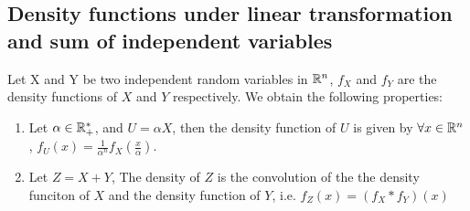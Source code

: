 \documentclass[a4paper,10pt]{article}
\begin{document}
\subsection{Density functions under linear transformation and sum of independent variables}
\begin{proposition}\label{prop:quelques_resultats_sur_la_densite}
    Let X and Y be two independent random variables in $\mathbb{R}^n$, $f_X$ and $f_Y$ are the density functions of $X$ and $Y$ respectively. We obtain the following properties:
\begin{enumerate}[label=(\roman*)]
    \item[] Let $\alpha \in \mathbb{R}_+^*$, and $U = \alpha X$, then the density function of $U$ is given by $\forall x\in \mathbb{R}^n$, $f_U(x) = \frac{1}{\alpha^n} f_X(\frac{x}{\alpha})$.
    \item[] Let $Z = X+Y$, The density of $Z$ is the convolution of the the density funciton of $X$ and the density function of $Y$, i.e. $f_Z(x) = (f_X * f_Y)(x)$
\end{enumerate}
\end{proposition}
\end{document}
